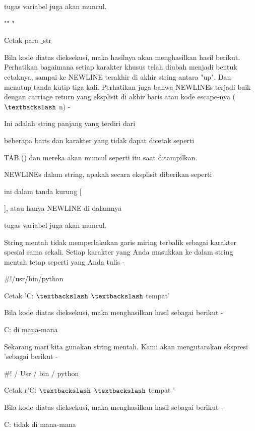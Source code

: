 tugas variabel juga akan muncul. \par
"" " \par
Cetak para $  \_  $str \par
Bila kode diatas dieksekusi, maka hasilnya akan menghasilkan hasil berikut. Perhatikan bagaimana setiap karakter khusus telah diubah menjadi bentuk cetaknya, sampai ke NEWLINE terakhir di akhir string antara "up". Dan menutup tanda kutip tiga kali. Perhatikan juga bahwa NEWLINEs terjadi baik dengan carriage return yang eksplisit di akhir baris atau kode escape-nya ( $  \textbackslash  $ n) - \par
Ini adalah string panjang yang terdiri dari \par
beberapa baris dan karakter yang tidak dapat dicetak seperti \par
TAB () dan mereka akan muncul seperti itu saat ditampilkan. \par
NEWLINEs dalam string, apakah secara eksplisit diberikan seperti \par
ini dalam tanda kurung [ \par
 ], atau hanya NEWLINE di dalamnya \par
tugas variabel juga akan muncul. \par
String mentah tidak memperlakukan garis miring terbalik sebagai karakter spesial sama sekali. Setiap karakter yang Anda masukkan ke dalam string mentah tetap seperti yang Anda tulis - \par
\vspace{12pt}
 $  \#  $!/usr/bin/python \par
\vspace{12pt}
Cetak 'C:  $  \textbackslash  $ $  \textbackslash  $ tempat' \par
Bila kode diatas dieksekusi, maka menghasilkan hasil sebagai berikut - \par
C: di mana-mana \par
Sekarang mari kita gunakan string mentah. Kami akan mengutarakan ekspresi 'sebagai berikut - \par
\vspace{12pt}
 $  \#  $! / Usr / bin / python \par
\vspace{12pt}
Cetak r'C:  $  \textbackslash  $ $  \textbackslash  $ tempat ' \par
\vspace{12pt}
Bila kode diatas dieksekusi, maka menghasilkan hasil sebagai berikut - \par
C: tidak di mana-mana \par
